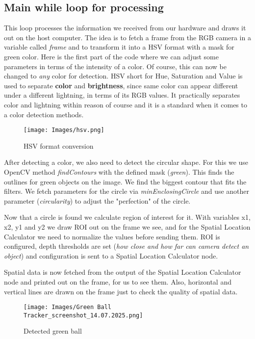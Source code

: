 \documentclass{article}
\begin{document}
\subsection{Main while loop for processing}
This loop processes the information we received from our hardware and draws it out on the host computer. The idea is to fetch a frame from the RGB camera in a variable called \textit{frame} and to transform it into a HSV format with a mask for green color. Here is the first part of the code where we can adjust some parameters in terms of the intensity of a color. Of course, this can now be changed to \textit{any} color for detection. HSV short for Hue, Saturation and Value is used to separate \textbf{color} and \textbf{brightness}, since same color can appear different under a different lightning, in terms of its RGB values. It practically separates color and lightning within reason of course and it is a standard when it comes to a color detection methods.

\begin{figure}[H]
    \centering
    \texttt{[image: Images/hsv.png]}
    \caption{HSV format conversion}
    \label{fig:enter-label}
\end{figure}

After detecting a color, we also need to detect the circular shape. For this we use OpenCV method \textit{findContours} with the defined mask (\textit{green}). This finds the outlines for green objects on the image. We find the biggest contour that fits the filters. We fetch parameters for the circle via \textit{minEnclosingCircle} and use another parameter (\textit{circularity}) to adjust the "perfection" of the circle. 

Now that a circle is found we calculate region of interest for it. With variables x1, x2, y1 and y2 we draw ROI out on the frame we see, and for the Spatial Location Calculator we need to normalize the values before sending them. ROI is configured, depth thresholds are set (\textit{how close and how far can camera detect an object}) and configuration is sent to a Spatial Location Calculator node. 

Spatial data is now fetched from the output of the Spatial Location Calculator node and printed out on the frame, for us to see them. Also, horizontal and vertical lines are drawn on the frame just to check the quality of spatial data. 

\begin{figure}[H]
    \centering
    \texttt{[image: Images/Green Ball Tracker\_screenshot\_14.07.2025.png]}
    \caption{Detected green ball}
    \label{fig:enter-label}
\end{figure}
\end{document}
